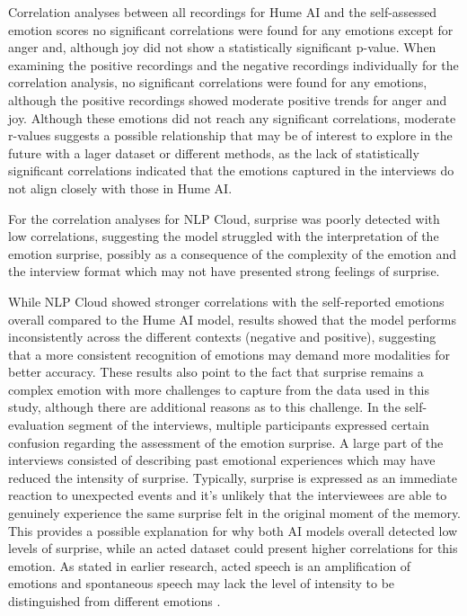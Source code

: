 Correlation analyses between all recordings for Hume AI and the self-assessed emotion scores no significant correlations were found for any emotions except for anger and, although joy did not show a statistically significant p-value. 
When examining the positive recordings and the negative recordings individually for the correlation analysis, no significant correlations were found for any emotions, although the positive recordings showed moderate positive trends for anger and joy. Although these emotions did not reach any significant correlations, moderate r-values suggests a possible relationship that may be of interest to explore in the future with a lager dataset or different methods, as the lack of statistically significant correlations indicated that the emotions captured in the interviews do not align closely with those in Hume AI. 

For the correlation analyses for NLP Cloud, surprise was poorly detected with low correlations, suggesting the model struggled with the interpretation of the emotion surprise, possibly as a consequence of the complexity of the emotion and the interview format which may not have presented strong feelings of surprise.

While NLP Cloud showed stronger correlations with the self-reported emotions overall compared to the Hume AI model, results showed that the model performs inconsistently across the different contexts (negative and positive), suggesting that a more consistent recognition of emotions may demand more modalities for better accuracy. These results also point to the fact that surprise remains a complex emotion with more challenges to capture from the data used in this study, although there are additional reasons as to this challenge. In the self-evaluation segment of the interviews, multiple participants expressed certain confusion regarding the assessment of the emotion surprise. A large part of the interviews consisted of describing past emotional experiences which may have reduced the intensity of surprise. Typically, surprise is expressed as an immediate reaction to unexpected events and it’s unlikely that the interviewees are able to genuinely experience the same surprise felt in the original moment of the memory. This provides a possible explanation for why both AI models overall detected low levels of surprise, while an acted dataset could present higher correlations for this emotion. As stated in earlier research, acted speech is an amplification of emotions and spontaneous speech may lack the level of intensity to be distinguished from different emotions \autocite{Chakraborty2016}.

